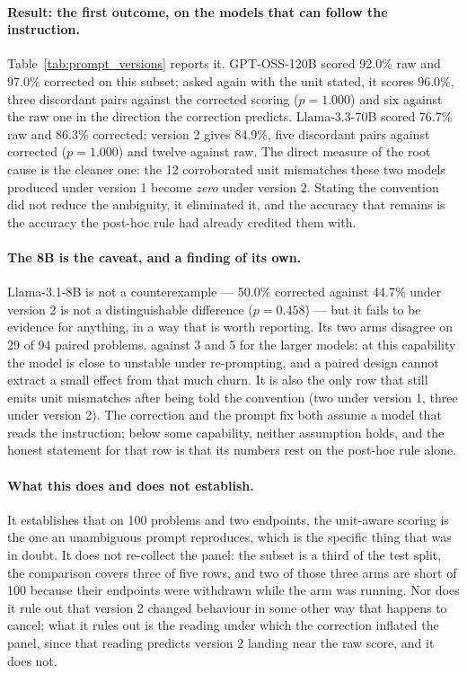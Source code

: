 \documentclass{article}
\begin{document}
\paragraph{Result: the first outcome, on the models that can follow the instruction.} Table~\ref{tab:prompt_versions} reports it. GPT-OSS-120B scored 92.0\% raw and 97.0\% corrected on this subset; asked again with the unit stated, it scores 96.0\%, three discordant pairs against the corrected scoring ($p = 1.000$) and six against the raw one in the direction the correction predicts. Llama-3.3-70B scored 76.7\% raw and 86.3\% corrected; version 2 gives 84.9\%, five discordant pairs against corrected ($p = 1.000$) and twelve against raw. The direct measure of the root cause is the cleaner one: the 12 corroborated unit mismatches these two models produced under version 1 become \emph{zero} under version 2. Stating the convention did not reduce the ambiguity, it eliminated it, and the accuracy that remains is the accuracy the post-hoc rule had already credited them with.

\paragraph{The 8B is the caveat, and a finding of its own.} Llama-3.1-8B is not a counterexample --- 50.0\% corrected against 44.7\% under version 2 is not a distinguishable difference ($p = 0.458$) --- but it fails to be evidence for anything, in a way that is worth reporting. Its two arms disagree on 29 of 94 paired problems, against 3 and 5 for the larger models: at this capability the model is close to unstable under re-prompting, and a paired design cannot extract a small effect from that much churn. It is also the only row that still emits unit mismatches after being told the convention (two under version 1, three under version 2). The correction and the prompt fix both assume a model that reads the instruction; below some capability, neither assumption holds, and the honest statement for that row is that its numbers rest on the post-hoc rule alone.

\paragraph{What this does and does not establish.} It establishes that on 100 problems and two endpoints, the unit-aware scoring is the one an unambiguous prompt reproduces, which is the specific thing that was in doubt. It does not re-collect the panel: the subset is a third of the test split, the comparison covers three of five rows, and two of those three arms are short of 100 because their endpoints were withdrawn while the arm was running. Nor does it rule out that version 2 changed behaviour in some other way that happens to cancel; what it rules out is the reading under which the correction inflated the panel, since that reading predicts version 2 landing near the raw score, and it does not.
\end{document}
